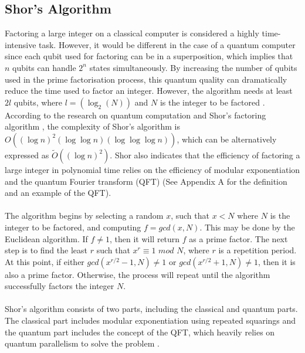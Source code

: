 \documentclass[12pt]{third-rep}
\begin{document}
\subsection{Shor's Algorithm}
Factoring a large integer on a classical computer is considered a highly time-intensive task. However, it would be different in the case of a quantum computer since each qubit used for factoring can be in a superposition, which implies that $n$ qubits can handle $2^n$ states simultaneously.  By increasing the number of qubits used in the prime factorisation process, this quantum quality can dramatically reduce the time used to factor an integer. However, the algorithm needs at least $2l$ qubits, where $l=(\log_2 (N))$ and $N$ is the integer to be factored \cite{shanghai}. According to the research on quantum computation and Shor's factoring algorithm \cite{cwi}, the complexity of Shor's algorithm is $O((\log n)^2(\log\log n)(\log\log\log n))$, which can be alternatively expressed as ${\tilde O}((\log n)^2)$. Shor also indicates that the efficiency of factoring a large integer in polynomial time relies on the efficiency of modular exponentiation and the quantum Fourier transform (QFT) (See Appendix A for the definition and an example of the QFT). \\\\
The algorithm begins by selecting a random $x$, such that $x < N$ where $N$ is the integer to be factored, and computing $f = gcd(x,N)$. This may be done by the Euclidean algorithm. If $f\neq1$, then it will return $f$ as a prime factor. The next step is to find the least $r$ such that $x^r\equiv1$ $mod$ $N$, where $r$ is a repetition period. At this point, if either $gcd(x^{r/2}-1,N)\neq1$ or $gcd(x^{r/2}+1,N)\neq1$, then it is also a prime factor. Otherwise, the process will repeat until the algorithm successfully factors the integer $N$. \\\\
Shor's algorithm consists of two parts, including the classical and quantum parts. The classical part includes modular exponentiation using repeated squarings and the quantum part includes the concept of the QFT, which heavily relies on quantum parallelism to solve the problem \cite{mcgill}. 
\end{document}

